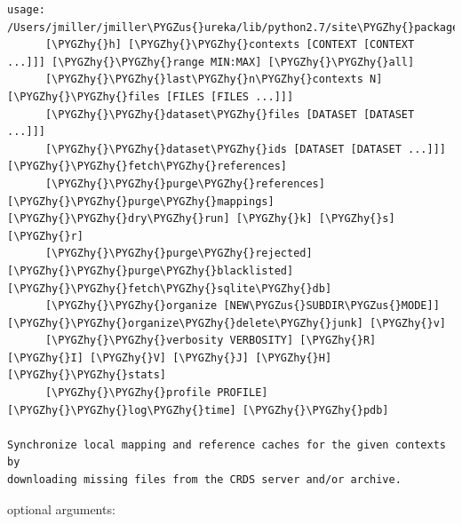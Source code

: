 \documentclass[letterpaper,10pt,english]{sphinxmanual}
\def\PYGZus{\char`\_}
\def\PYGZhy{\char`\-}
\begin{document}
\begin{Verbatim}[commandchars=\\\{\}]
usage: /Users/jmiller/jmiller\PYGZus{}ureka/lib/python2.7/site\PYGZhy{}packages/crds/sync.py
      [\PYGZhy{}h] [\PYGZhy{}\PYGZhy{}contexts [CONTEXT [CONTEXT ...]]] [\PYGZhy{}\PYGZhy{}range MIN:MAX] [\PYGZhy{}\PYGZhy{}all]
      [\PYGZhy{}\PYGZhy{}last\PYGZhy{}n\PYGZhy{}contexts N] [\PYGZhy{}\PYGZhy{}files [FILES [FILES ...]]]
      [\PYGZhy{}\PYGZhy{}dataset\PYGZhy{}files [DATASET [DATASET ...]]]
      [\PYGZhy{}\PYGZhy{}dataset\PYGZhy{}ids [DATASET [DATASET ...]]] [\PYGZhy{}\PYGZhy{}fetch\PYGZhy{}references]
      [\PYGZhy{}\PYGZhy{}purge\PYGZhy{}references] [\PYGZhy{}\PYGZhy{}purge\PYGZhy{}mappings] [\PYGZhy{}\PYGZhy{}dry\PYGZhy{}run] [\PYGZhy{}k] [\PYGZhy{}s] [\PYGZhy{}r]
      [\PYGZhy{}\PYGZhy{}purge\PYGZhy{}rejected] [\PYGZhy{}\PYGZhy{}purge\PYGZhy{}blacklisted] [\PYGZhy{}\PYGZhy{}fetch\PYGZhy{}sqlite\PYGZhy{}db]
      [\PYGZhy{}\PYGZhy{}organize [NEW\PYGZus{}SUBDIR\PYGZus{}MODE]] [\PYGZhy{}\PYGZhy{}organize\PYGZhy{}delete\PYGZhy{}junk] [\PYGZhy{}v]
      [\PYGZhy{}\PYGZhy{}verbosity VERBOSITY] [\PYGZhy{}R] [\PYGZhy{}I] [\PYGZhy{}V] [\PYGZhy{}J] [\PYGZhy{}H] [\PYGZhy{}\PYGZhy{}stats]
      [\PYGZhy{}\PYGZhy{}profile PROFILE] [\PYGZhy{}\PYGZhy{}log\PYGZhy{}time] [\PYGZhy{}\PYGZhy{}pdb]

Synchronize local mapping and reference caches for the given contexts by
downloading missing files from the CRDS server and/or archive.
\end{Verbatim}

optional arguments:
\end{document}
